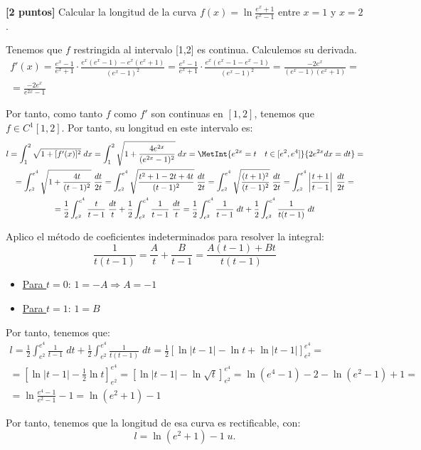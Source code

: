 \documentclass[12pt]{article}
\begin{document}
\begin{ejercicio}
    \textbf{[2 puntos]} Calcular la longitud de la curva $f(x)=\ln \frac{e^x+1}{e^x-1}$ entre $x=1$ y $x=2$.

    Tenemos que $f$ restringida al intervalo [1,2] es continua. Calculemos su derivada.
    \begin{multline*}
        f'(x)=\frac{e^x-1}{e^x+1}\cdot \frac{e^x(e^x-1) -e^x(e^x+1)}{(e^x-1)^2}
        = \frac{e^x-1}{e^x+1}\cdot \frac{e^x(e^x-1-e^x -1)}{(e^x-1)^2}
        = \frac{-2e^x}{(e^x-1)(e^x+1)}
        =\\
        = \frac{-2e^x}{e^{2x}-1}
    \end{multline*}

    Por tanto, como tanto $f$ como $f'$ son continuas en $[1,2]$, tenemos que $f\in C^1[1,2]$. Por tanto, su longitud en este intervalo es:
    \begin{multline*}
        l=\int_1^2 \sqrt{1+[f'(x)]^2}\;dx
        =\int_1^2 \sqrt{1+\frac{4e^{2x}}{(e^{2x}-1)^2}}\;dx = \MetInt{e^{2x}=t \quad t\in [e^2, e^4]}{2e^{2x}dx=dt}
        =\\
        = \int_{e^2}^{e^4} \sqrt{1+\frac{4t}{(t-1)^2}}\;\frac{dt}{2t}
        = \int_{e^2}^{e^4} \sqrt{\frac{t^2+1-2t+4t}{(t-1)^2}}\;\frac{dt}{2t}
        = \int_{e^2}^{e^4} \sqrt{\frac{(t+1)^2}{(t-1)^2}}\;\frac{dt}{2t}
        = \int_{e^2}^{e^4} \left|\frac{t+1}{t-1}\right|\;\frac{dt}{2t} =\\
        = \frac{1}{2}\int_{e^2}^{e^4} \frac{t}{t-1}\;\frac{dt}{t}
        + \frac{1}{2}\int_{e^2}^{e^4} \frac{1}{t-1}\;\frac{dt}{t}
        = \frac{1}{2}\int_{e^2}^{e^4} \frac{1}{t-1}\;dt
        + \frac{1}{2}\int_{e^2}^{e^4} \frac{1}{t(t-1)}\;dt
    \end{multline*}

    Aplico el método de coeficientes indeterminados para resolver la integral:
    \begin{equation*}
        \frac{1}{t(t-1)} = \frac{A}{t} + \frac{B}{t-1} = \frac{A(t-1)+Bt}{t(t-1)}
    \end{equation*}
    \begin{itemize}
        \item \underline{Para $t=0$}: $1=-A\Longrightarrow A=-1$
        \item \underline{Para $t=1$}: $1=B$
    \end{itemize}

    Por tanto, tenemos que:
    \begin{multline*}
        l= \frac{1}{2}\int_{e^2}^{e^4} \frac{1}{t-1}\;dt
        + \frac{1}{2}\int_{e^2}^{e^4} \frac{1}{t(t-1)}\;dt = \frac{1}{2}\left[\ln |t-1| -\ln t +\ln |t-1|\right]_{e^2}^{e^4}=\\
        = \left[\ln |t-1| -\frac{1}{2}\ln t \right]_{e^2}^{e^4}
        = \left[\ln |t-1| -\ln \sqrt{t} \right]_{e^2}^{e^4} = \ln(e^4-1) -2 -\ln (e^2-1) +1
        =\\= \ln \frac{e^4-1}{e^2-1} -1
        = \ln(e^2+1) -1
    \end{multline*}

    Por tanto, tenemos que la longitud de esa curva es rectificable, con: $$l=\ln (e^2+1) -1\;u.$$
\end{ejercicio}
\end{document}
